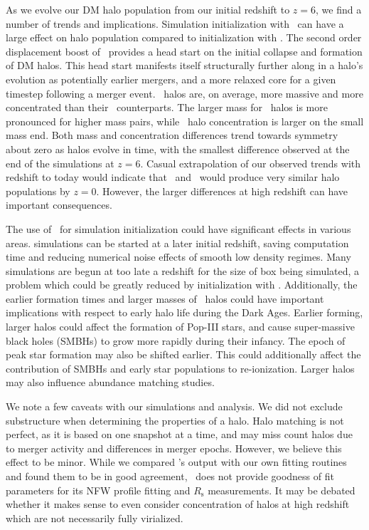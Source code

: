 As we evolve our DM halo population from our initial redshift to $z = 6$, we find a number of trends and implications.  Simulation initialization with \lpt\ can have a large effect on halo population compared to initialization with \za.  The second order displacement boost of \lpt\ provides a head start on the initial collapse and formation of DM halos.  This head start manifests itself structurally further along in a halo's evolution as potentially earlier mergers, and a more relaxed core for a given timestep following a merger event.  \lpt\ halos are, on average, more massive and more concentrated than their \za\ counterparts.  The larger mass for \lpt\ halos is more pronounced for higher mass pairs, while \lpt\ halo concentration is larger on the small mass end.  Both mass and concentration differences trend towards symmetry about zero as halos evolve in time, with the smallest difference observed at the end of the simulations at $z = 6$.  Casual extrapolation of our observed trends with redshift to today would indicate that \lpt\ and \za\ would produce very similar halo populations by $z = 0$.  However, the larger differences at high redshift can have important consequences.

The use of \lpt\ for simulation initialization could have significant effects in various areas.  \lpt simulations can be started at a later initial redshift, saving computation time and reducing numerical noise effects of smooth low density regimes.  Many simulations are begun at too late a redshift for the size of box being simulated\cn, a problem which could be greatly reduced by initialization with \lpt.  Additionally, the earlier formation times and larger masses of \lpt\ halos could have important implications with respect to early halo life during the Dark Ages.  Earlier forming, larger halos could affect the formation of Pop-III stars, and cause super-massive black holes (SMBHs) to grow more rapidly during their infancy.  The epoch of peak star formation may also be shifted earlier.  This could additionally affect the contribution of SMBHs and early star populations to re-ionization.  Larger halos may also influence abundance matching studies.

We note a few caveats with our simulations and analysis.  We did not exclude substructure when determining the properties of a halo.  Halo matching is not perfect, as it is based on one snapshot at a time, and may miss count halos due to merger activity and differences in merger epochs.  However, we believe this effect to be minor.  While we compared \rockstar's output with our own fitting routines and found them to be in good agreement, \rockstar\ does not provide goodness of fit parameters for its NFW profile fitting and $R_{\mathrm{s}}$ measurements.  It may be debated whether it makes sense to even consider concentration of halos at high redshift which are not necessarily fully virialized.

